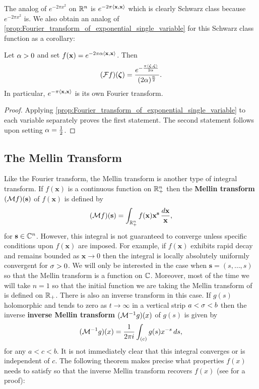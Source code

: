       The analog of $e^{-2\pi x^{2}}$ on $\mathbb{R}^{n}$ is $e^{-2\pi\langle\mathbf{x},\mathbf{x}\rangle}$ which is clearly Schwarz class because $e^{-2\pi x^{2}}$ is. We also obtain an analog of \cref{prop:Fourier_transform_of_exponential_single_variable} for this Schwarz class function as a corollary:

      \begin{corollary}\label{cor:Fourier_transform_of_exponential_single_variable}
        Let $\alpha > 0$ and set $f(\mathbf{x}) = e^{-2\pi\alpha\langle\mathbf{x},\mathbf{x}\rangle}$. Then
        \[
          (\mathcal{F}f)(\boldsymbol{\zeta}) = \frac{e^{-\frac{\pi\langle\boldsymbol{\zeta},\boldsymbol{\zeta}\rangle}{2\alpha}}}{(2\alpha)^{\frac{n}{2}}}.
        \]
        In particular, $e^{-\pi\langle\mathbf{x},\mathbf{x}\rangle}$ is its own Fourier transform.
      \end{corollary}
      \begin{proof}
        Applying \cref{prop:Fourier_transform_of_exponential_single_variable} to each variable separately proves the first statement. The second statement follows upon setting $\alpha = \frac{1}{2}$.
      \end{proof}
    \subsection*{The Mellin Transform}
      Like the Fourier transform, the Mellin transform is another type of integral transform. If $f(\mathbf{x})$ is a continuous function on $\mathbb{R}_{+}^{n}$ then the \textbf{Mellin transform} $(\mathcal{M}f)(\mathbf{s})$ of $f(\mathbf{x})$ is defined by
      \[
        (\mathcal{M}f)(\mathbf{s}) = \int_{\mathbb{R}_{+}^{n}}f(\mathbf{x})\mathbf{x}^{\mathbf{s}}\,\frac{d\mathbf{x}}{\mathbf{x}},
      \]
      for $\mathbf{s} \in \mathbb{C}^{n}$. However, this integral is not guaranteed to converge unless specific conditions upon $f(\mathbf{x})$ are imposed. For example, if $f(\mathbf{x})$ exhibits rapid decay and remains bounded as $\mathbf{x} \to 0$ then the integral is locally absolutely uniformly convergent for $\sigma > 0$. We will only be interested in the case when $\mathbf{s} = (s,\ldots,s)$ so that the Mellin transform is a function on $\mathbb{C}$. Moreover, most of the time we will take $n = 1$ so that the initial function we are taking the Mellin transform of is defined on $\mathbb{R}_{+}$. There is also an inverse transform in this case. If $g(s)$ holomorphic and tends to zero as $t \to \infty$ in a vertical strip $a < \sigma < b$ then the inverse \textbf{inverse Mellin transform} $(\mathcal{M}^{-1}g)(x)$ of $g(s)$ is given by
      \[
        (\mathcal{M}^{-1}g)(x) = \frac{1}{2\pi i}\int_{(c)}g(s)x^{-s}\,ds,
      \]
      for any $a < c < b$.
      It is not immediately clear that this integral converges or is independent of $c$. The following theorem makes precise what properties $f(x)$ needs to satisfy so that the inverse Mellin transform recovers $f(x)$ (see \cite{debnath2002integral} for a proof):


